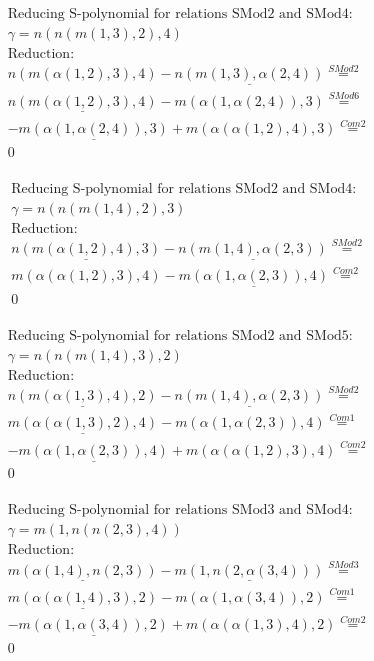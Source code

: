 \documentclass[11pt]{amsart}
\begin{document}
\begin{align*} 
& \text{Reducing S-polynomial for relations SMod2 and SMod4:} \\ 
& \gamma = n(n(m(1,3),2),4) \\ 
& \text{Reduction}: \\&n(m(\alpha(1,2),3),4) - \underline{n(m(1,3),\alpha(2,4))} \stackrel{ SMod2 }{=}  \\ 
&\underline{n(m(\alpha(1,2),3),4)} - m(\alpha(1,\alpha(2,4)),3) \stackrel{ SMod6 }{=}  \\ 
& - \underline{m(\alpha(1,\alpha(2,4)),3)} + m(\alpha(\alpha(1,2),4),3) \stackrel{ Com2 }{=}  \\ 
&0\\ 
\end{align*} 
 
\begin{align*} 
& \text{Reducing S-polynomial for relations SMod2 and SMod4:} \\ 
& \gamma = n(n(m(1,4),2),3) \\ 
& \text{Reduction}: \\&\underline{n(m(\alpha(1,2),4),3)} - \underline{n(m(1,4),\alpha(2,3))} \stackrel{ SMod2 }{=}  \\ 
&m(\alpha(\alpha(1,2),3),4) - \underline{m(\alpha(1,\alpha(2,3)),4)} \stackrel{ Com2 }{=}  \\ 
&0\\ 
\end{align*} 
 
\begin{align*} 
& \text{Reducing S-polynomial for relations SMod2 and SMod5:} \\ 
& \gamma = n(n(m(1,4),3),2) \\ 
& \text{Reduction}: \\&\underline{n(m(\alpha(1,3),4),2)} - \underline{n(m(1,4),\alpha(2,3))} \stackrel{ SMod2 }{=}  \\ 
&\underline{m(\alpha(\alpha(1,3),2),4)} - m(\alpha(1,\alpha(2,3)),4) \stackrel{ Com1 }{=}  \\ 
& - \underline{m(\alpha(1,\alpha(2,3)),4)} + m(\alpha(\alpha(1,2),3),4) \stackrel{ Com2 }{=}  \\ 
&0\\ 
\end{align*} 
 
\begin{align*} 
& \text{Reducing S-polynomial for relations SMod3 and SMod4:} \\ 
& \gamma = m(1,n(n(2,3),4)) \\ 
& \text{Reduction}: \\&\underline{m(\alpha(1,4),n(2,3))} - \underline{m(1,n(2,\alpha(3,4)))} \stackrel{ SMod3 }{=}  \\ 
&\underline{m(\alpha(\alpha(1,4),3),2)} - m(\alpha(1,\alpha(3,4)),2) \stackrel{ Com1 }{=}  \\ 
& - \underline{m(\alpha(1,\alpha(3,4)),2)} + m(\alpha(\alpha(1,3),4),2) \stackrel{ Com2 }{=}  \\ 
&0\\ 
\end{align*} 
 
\end{document}
